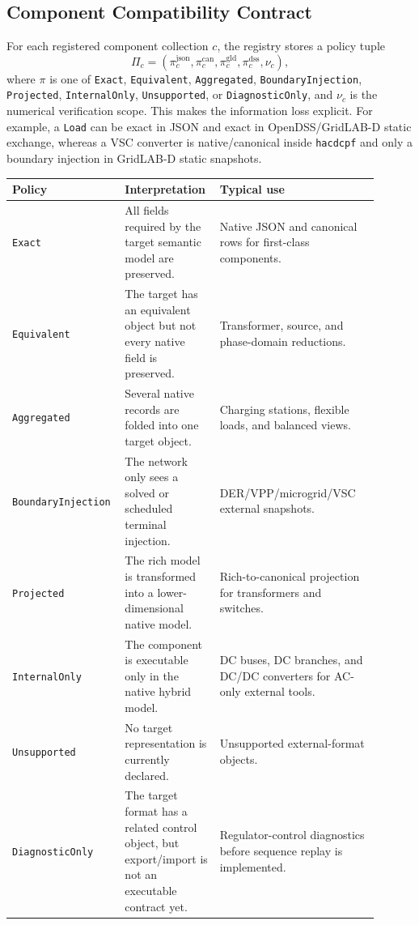 \subsection{Component Compatibility Contract}

For each registered component collection \(c\), the registry stores a policy
tuple
\[
  \Pi_c =
  \left(
    \pi^{\mathrm{json}}_c,
    \pi^{\mathrm{can}}_c,
    \pi^{\mathrm{gld}}_c,
    \pi^{\mathrm{dss}}_c,
    \nu_c
  \right),
\]
where \(\pi\) is one of \texttt{Exact}, \texttt{Equivalent},
\texttt{Aggregated}, \texttt{BoundaryInjection}, \texttt{Projected},
\texttt{InternalOnly}, \texttt{Unsupported}, or \texttt{DiagnosticOnly}, and
\(\nu_c\) is the numerical verification scope.  This makes the information
loss explicit.  For example, a \texttt{Load} can be exact in JSON and exact in
OpenDSS/GridLAB-D static exchange, whereas a VSC converter is native/canonical
inside \texttt{hacdcpf} and only a boundary injection in GridLAB-D static
snapshots.

\begin{longtable}{L{0.24\linewidth}L{0.24\linewidth}L{0.42\linewidth}}
\toprule
Policy & Interpretation & Typical use \\
\midrule
\endhead
\texttt{Exact} & All fields required by the target semantic model are preserved. & Native JSON and canonical rows for first-class components. \\
\texttt{Equivalent} & The target has an equivalent object but not every native field is preserved. & Transformer, source, and phase-domain reductions. \\
\texttt{Aggregated} & Several native records are folded into one target object. & Charging stations, flexible loads, and balanced views. \\
\texttt{BoundaryInjection} & The network only sees a solved or scheduled terminal injection. & DER/VPP/microgrid/VSC external snapshots. \\
\texttt{Projected} & The rich model is transformed into a lower-dimensional native model. & Rich-to-canonical projection for transformers and switches. \\
\texttt{InternalOnly} & The component is executable only in the native hybrid model. & DC buses, DC branches, and DC/DC converters for AC-only external tools. \\
\texttt{Unsupported} & No target representation is currently declared. & Unsupported external-format objects. \\
\texttt{DiagnosticOnly} & The target format has a related control object, but export/import is not an executable contract yet. & Regulator-control diagnostics before sequence replay is implemented. \\
\bottomrule
\end{longtable}

